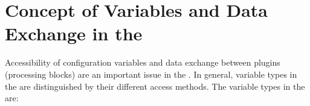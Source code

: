 
\section{Concept of Variables and Data Exchange in the \mha{}}
\label{sec:variables}

Accessibility of configuration variables and
data exchange between plugins (processing blocks) are an important issue in the
\mha{}. In general, variable types in the \mha{} are distinguished by their
different access methods. The variable types in the \mha{} are:

